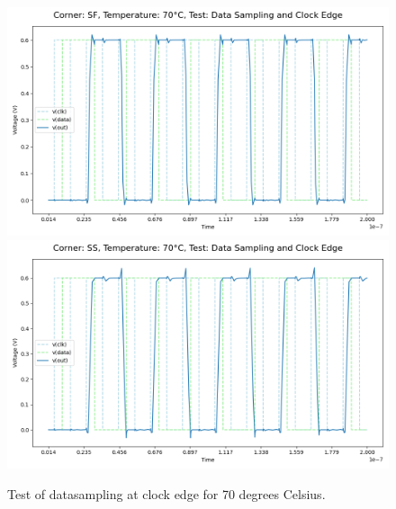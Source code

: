 \begin{figure}[H]
    \vspace{5pt}
    \includegraphics[height= 0.21\textheight]{figures/aimspice/SF/70/W1.csv.png}
    \vspace{5pt}
    \includegraphics[height= 0.21\textheight]{figures/aimspice/SS/70/W1.csv.png}
    \caption{Test of datasampling at clock edge for 70 degrees Celsius.}
    \label{fig:aimspice_W1_70}
\end{figure}

\pagebreak

